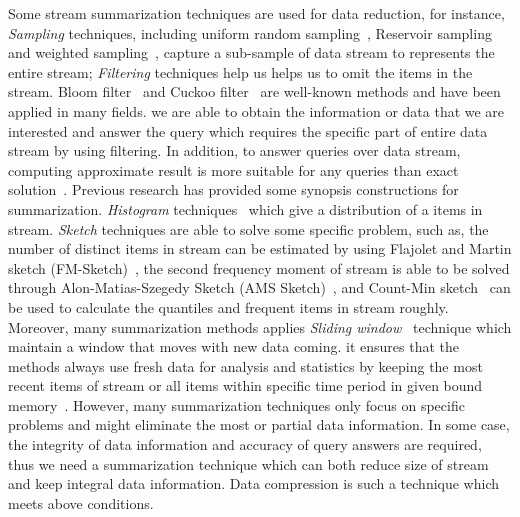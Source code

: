 Some stream summarization techniques are used for data reduction, for instance,
\emph{Sampling} techniques, including uniform random
sampling~\cite{vitter1984faster, Ahrens1985SequentialRS}, Reservoir
sampling~\cite{vitter1985random, Aggarwal2007DataS} and weighted
sampling~\cite{chaudhuri1999random, efraimidis2006weighted}, capture a
sub-sample of data stream to represents the entire stream; \emph{Filtering}
techniques help us helps us to omit the items in the stream. Bloom
filter~\cite{bloom1970space} and Cuckoo filter~\cite{fan2014cuckoo} are
well-known methods and have been applied in many fields. we are able to obtain
the information or data that we are interested and answer the query which
requires the specific part of entire data stream by using filtering. In
addition, to  answer queries over data stream, computing approximate result is
more suitable for any queries than exact solution~\cite{kejariwal2015real}.
Previous research has provided some synopsis constructions for summarization.
\emph{Histogram} techniques~\cite{kejariwal2015real, ahmed2019data} which give a
distribution of a items in stream. \emph{Sketch} techniques are able to solve
some specific problem, such as, the number of distinct items in stream can be
estimated by using Flajolet and Martin sketch
(FM-Sketch)~\cite{flajolet1985probabilistic, garofalakis2016data}, the second
frequency moment of stream is able to be solved through Alon-Matias-Szegedy
Sketch (AMS Sketch)~\cite{alon1999space}, and Count-Min
sketch~\cite{cormode2005improved, garofalakis2016data} can be used to calculate
the quantiles and frequent items in stream roughly. Moreover, many summarization
methods applies \emph{Sliding window}~\cite{datar2002maintaining} technique
which maintain a window that moves with new data coming. it ensures that the
methods always use fresh data for analysis and statistics by keeping the most
recent items of stream or all items within specific time period in given bound
memory~\cite{leskovec2014mining}. However, many summarization techniques only
focus on specific problems and might eliminate the most or partial data
information. In some case, the integrity of data information and accuracy of
query answers are required, thus we need a summarization technique which can
both reduce size of stream and  keep integral data information. Data compression
is such a technique which meets above conditions. 


